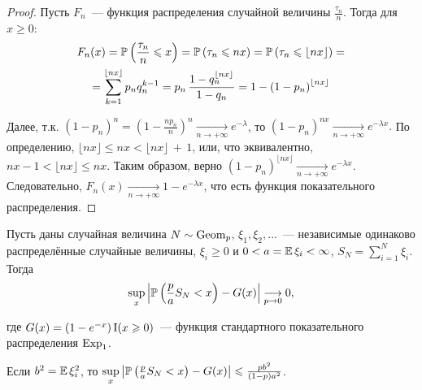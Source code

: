 \begin{proof}
    Пусть $F_n$~--- функция распределения случайной величины $\frac{\tau_n}{n}$.
    Тогда для $x \geqslant 0$:
    \begin{multline*}        
        F_{n}(x)=\operatorname{\mathbb{P}}\left(\frac{\tau_{n}}{n} \leqslant x\right)=
        \operatorname{\mathbb{P}}\left(\tau_{n} \leqslant n x\right) = 
        \operatorname{\mathbb{P}}\left(\tau_{n} \leqslant \lfloor n x\rfloor\right) = \\
        = \sum\limits_{k = 1}^{\lfloor nx \rfloor} p_n q_n^{k-1} =
        p_n \, \frac{1 - q_n^{\lfloor nx \rfloor}} {1-q_n} =
        1-\left(1-p_{n}\right)^{\lfloor nx \rfloor}
    \end{multline*}
    
    Далее, т.к. $\left(1-p_{n}\right)^{n}=\left(1-\frac{n p_{n}}{n}\right)^{n} \xrightarrow[n \to +\infty]{} e^{-\lambda}$,
    то $(1 - p_n)^{nx} \xrightarrow[n \to +\infty]{} e^{-\lambda x}.$
    По определению, $\lfloor n x\rfloor \leqslant n x < \lfloor n x\rfloor\,+\,1$,
    или, что эквивалентно, $nx - 1 < \lfloor nx \rfloor \leqslant nx$.
    Таким образом, верно $(1 - p_n)^{\lfloor nx \rfloor} \xrightarrow[n \to +\infty]{} e^{-\lambda x}$.
    Следовательно, $F_n(x) \xrightarrow[n \to +\infty]{} 1 - e^{-\lambda x}$, что есть функция показательного распределения.
\end{proof}



\begin{namedthm}
Пусть даны случайная величина $N \sim \operatorname{\mathrm{Geom}}_{p}$, $\xi_1, \xi_2, \ldots$~--- независимые одинаково распределённые случайные величины, 
$\xi_i \geqslant 0$ и $0 < a = \operatorname{\mathbb{E}} \xi_i < \infty$, $S_N = \sum\limits_{i=1}^N \xi_i$. Тогда
\begin{equation*}
    \sup\limits_{x}\left|\operatorname{\mathbb{P}}\left(\frac{p}{a} S_{N}<x\right)-G(x)\right| \underset{p \to 0}{\longrightarrow} 0,
\end{equation*}

где $G(x)=\left(1-e^{-x}\right) \operatorname{\mathrm{I}}(x \geqslant 0)$~--- функция стандартного показательного распределения $\operatorname{\mathrm{Exp}}_{1}$.

Если $b^2 = \operatorname{\mathbb{E}} \xi_i^2$, то $\sup\limits_{x}\left|\operatorname{\mathbb{P}}\left(\frac{p}{a} S_{N}<x\right)-G(x)\right| \leqslant \frac{p b^{2}}{(1-p) a^{2}}$.
\end{namedthm}
